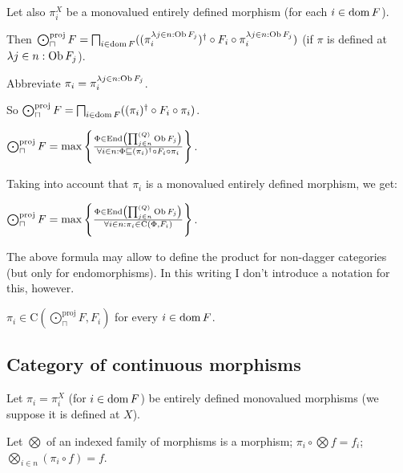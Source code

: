 Let also $\pi^X_i$ be a monovalued entirely defined morphism (for each $i \in
\operatorname{dom} F$).

Then $\bigodot^{\text{proj}}_{\sqcap} F = \bigsqcap_{i \in \operatorname{dom} F} ((\pi^{\lambda j \in n :
\operatorname{Ob} F_j}_i)^{\dagger} \circ F_i \circ \pi^{\lambda j \in n : \operatorname{Ob}
F_j}_i)$ (if $\pi$ is defined at $\lambda j \in n : \operatorname{Ob} F_j$).

Abbreviate $\pi_i = \pi^{\lambda j \in n : \operatorname{Ob} F_j}_i$.

So $\bigodot^{\text{proj}}_{\sqcap} F = \bigsqcap_{i \in \operatorname{dom} F} ((\pi_i)^{\dagger} \circ
F_i \circ \pi_i)$.

$\bigodot^{\text{proj}}_{\sqcap} F = \max \left\{ \frac{ \Phi \in \operatorname{End} \left( \prod^{(Q)}_{j \in n}
\operatorname{Ob} F_j \right) }{ \forall i \in n : \Phi
\sqsubseteq (\pi_i)^{\dagger} \circ F_i \circ \pi_i }\right\}$.

Taking into account that $\pi_i$ is a monovalued entirely defined morphism, we
get:

\begin{obvious}
$\bigodot^{\text{proj}}_{\sqcap} F = \max \left\{ \frac{ \Phi \in \operatorname{End} \left( \prod^{(Q)}_{j \in
n} \operatorname{Ob} F_j \right) }{ \forall i \in n : \pi_i
\in \mathrm{C} (\Phi , F_i) }\right\}$.
\end{obvious}

\begin{rem}
  The above formula may allow to define the product for non-dagger categories
  (but only for endomorphisms). In this writing I don't introduce a notation
  for this, however.
\end{rem}

\begin{cor}
  $\pi_i \in \mathrm{C} \left( \bigodot^{\text{proj}}_{\sqcap} F , F_i \right)$ for every $i \in
  \operatorname{dom} F$.
\end{cor}

\subsection{Category of continuous morphisms}

Let $\pi_i = \pi_i^X$ (for $i \in \operatorname{dom} F$) be entirely defined
monovalued morphisms (we suppose it is defined at $X$).

Let $\bigotimes$ of an indexed family of morphisms is a morphism; $\pi_i \circ
\bigotimes f = f_i$; $\bigotimes_{i \in n} (\pi_i \circ f) = f$.

